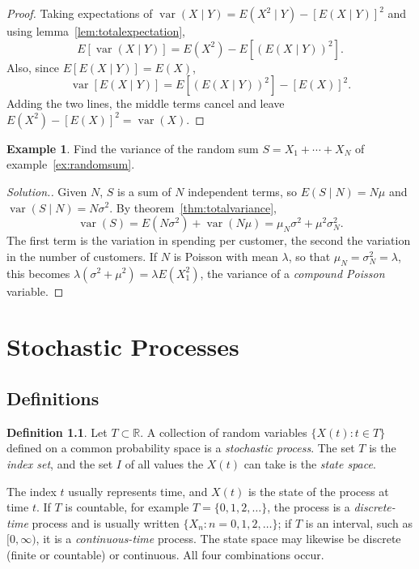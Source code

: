 \documentclass[12pt,a4paper]{report}
\theoremstyle{definition}
\newtheorem{defn}[thm]{Definition}
\newtheorem{exa}[thm]{Example}
\DeclareMathOperator{\var}{var}
\newenvironment{solution}
  {\renewcommand{\qedsymbol}{}\begin{proof}[\textit{Solution}.]}
  {\end{proof}}
\begin{document}
\begin{proof}
Taking expectations of $\var(X\mid Y) = E(X^2\mid Y) - \left[E(X\mid Y)\right]^2$ and using
lemma~\ref{lem:totalexpectation},
\[E\left[\var(X\mid Y)\right] = E(X^2) - E\left[\left(E(X\mid Y)\right)^2\right].\]
Also, since $E\left[E(X\mid Y)\right] = E(X)$,
\[\var\left[E(X\mid Y)\right] = E\left[\left(E(X\mid Y)\right)^2\right] - \left[E(X)\right]^2 .\]
Adding the two lines, the middle terms cancel and leave $E(X^2) - [E(X)]^2 = \var(X)$.
\end{proof}

\begin{exa}
\label{ex:randomsumvar}
Find the variance of the random sum $S = X_1 + \cdots + X_N$ of example~\ref{ex:randomsum}.
\end{exa}

\begin{solution}
Given $N$, $S$ is a sum of $N$ independent terms, so $E(S\mid N) = N\mu$ and
$\var(S\mid N) = N\sigma^2$. By theorem~\ref{thm:totalvariance},
\[\var(S) = E(N\sigma^2) + \var(N\mu) = \mu_N\sigma^2 + \mu^2\sigma_N^2 .\]
The first term is the variation in spending per customer, the second the variation in the
number of customers. If $N$ is Poisson with mean $\lambda$, so that $\mu_N = \sigma_N^2 = \lambda$,
this becomes $\lambda(\sigma^2 + \mu^2) = \lambda E(X_1^2)$, the variance of a
\emph{compound Poisson} variable.
\end{solution}

\chapter{Stochastic Processes}
\label{ch:processes}

\section{Definitions}

\begin{defn}
\label{def:process}
Let $T\subset\mathbb{R}$. A collection of random variables $\{X(t) : t\in T\}$ defined on a
common probability space is a \emph{stochastic process}. The set $T$ is the \emph{index set},
and the set $I$ of all values the $X(t)$ can take is the \emph{state space}.
\end{defn}

The index $t$ usually represents time, and $X(t)$ is the state of the process at time $t$.
If $T$ is countable, for example $T = \{0, 1, 2, \dots\}$, the process is a
\emph{discrete-time} process and is usually written $\{X_n : n = 0, 1, 2, \dots\}$; if $T$ is
an interval, such as $[0, \infty)$, it is a \emph{continuous-time} process. The state space
may likewise be discrete (finite or countable) or continuous. All four combinations occur.
\end{document}
